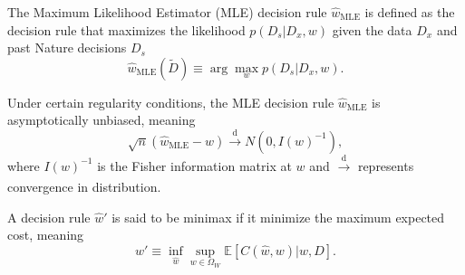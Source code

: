\begin{definition}
	\label{def:MLE}
	The Maximum Likelihood Estimator (MLE) decision rule $\hat{w}_{\text{MLE}}$ is defined as the decision rule that maximizes the likelihood $p(D_s|D_x,w)$ given the data $D_x$ and past Nature decisions $D_s$
	\begin{equation}
		\hat{w}_{\text{MLE}}(\tilde{D}) \equiv \arg \max_{w} p(D_s|D_x,w).
	\end{equation}
\end{definition}

\begin{theorem}
	\label{thm:unbiased_mle}
	Under certain regularity conditions, the MLE decision rule $\hat{w}_{\text{MLE}}$ is asymptotically unbiased, meaning
	\begin{equation}
		\sqrt{n}(\hat{w}_{\text{MLE}}-w)\xrightarrow[]{\text{d}} N(0,I(w)^{-1}),
	\end{equation}
	where $I(w)^{-1}$ is the Fisher information matrix at $w$ and $\xrightarrow[]{\text{d}}$ represents convergence in distribution.
\end{theorem}

\begin{definition}
	\label{def:minimax}
	A decision rule $\hat{w}'$ is said to be minimax if it minimize the maximum expected cost, meaning
	\begin{equation}
		\hat{w}' \equiv \inf_{\hat{w}}\sup_{w\in \Omega_W}\mathbb{E}[C(\hat{w},w)|w,D].
	\end{equation}
\end{definition}

